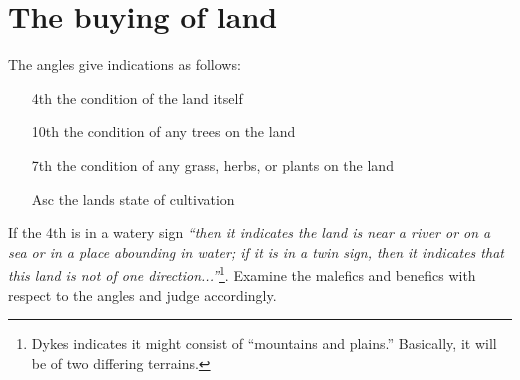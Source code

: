 \section{The buying of land}
The angles give indications as follows:
\begin{itemize}[topsep=0em,itemsep=0em]
\item[4th] the condition of the land itself
\item[10th] the condition of any trees on the land
\item[7th]  the condition of any grass, herbs, or plants on the land
\item[Asc] the lands state of cultivation
\end{itemize}

If the 4th is in a watery sign \textsl{``then it indicates the land is near a river or on a sea or in a place abounding in water; if it is in a twin sign, then it indicates that this land is not of one direction...''}\footnote{Dykes indicates it might consist of ``mountains and plains.'' Basically, it will be of two differing terrains.}.  Examine the malefics and benefics with respect to the angles and judge accordingly.



